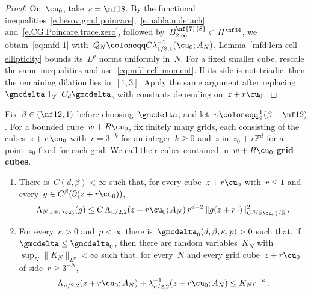 \documentclass[11pt]{amsart}
\begin{document}
\begin{proof}
On~$\cu_0$, take~$s=\nf18$. By the functional inequalities~\eqref{e.besov.grad.poincare},~\eqref{e.nabla.u.detach} and~\eqref{e.CG.Poincare.trace.zero}, followed by~$B^{\nf{7}{8}}_{2,\infty}\subset H^{\nf34}$, we obtain~\eqref{eq:mfd-1} with~$Q_N\coloneqq C\lambda_{1/8,1}^{-1}(\cu_0;A_N)$. Lemma~\ref{mfd:lem-cell-ellipticity} bounds its~$L^p$ norms uniformly in~$N$. For a fixed smaller cube, rescale the same inequalities and use~\eqref{eq:mfd-cell-moment}. If its side is not triadic, then the remaining dilation lies in~$[1,3]$. Apply the same argument after replacing~$\gmcdelta$ by~$C_d\gmcdelta$, with constants depending on~$z+r\cu_0$.
\end{proof}

Fix~$\beta\in(\nf12,1)$ before choosing~$\gmcdelta$, and let~$\upsilon\coloneqq\frac12(\beta-\nf12)$. For a bounded cube~$w+R\cu_0$, fix finitely many grids, each consisting of the cubes~$z+r\,\cu_0$ with~$r=3^{-k}$ for an integer~$k\geq0$ and~$z$ in~$z_0+r\mathbb Z^d$ for a point~$z_0$ fixed for each grid. We call their cubes contained in~$w+R\cu_0$ \textbf{grid cubes}.

\begin{lemma}
\label{mfd:lem-extension}
\begin{enumerate}[label=(\roman*)]
\item There is~$C(d,\beta)<\infty$ such that, for every cube~$z+r\cu_0$ with~$r\leq1$ and every~$g\in C^\beta(\partial(z+r\cu_0))$,
\begin{equation}
	\Lambda_{N,z+r\cu_0}(g)\leq C\,\Lambda_{\upsilon/2,2}(z+r\cu_0;A_N)\,r^{d-2}\,\|g(z+r\,\cdot)\|_{C^\beta(\partial \cu_0)/\mathbb R}^2\,.
	\label{eq:mfd-2}
\end{equation}
\item For every~$\kappa>0$ and~$p<\infty$ there is~$\gmcdelta_0(d,\beta,\kappa,p)>0$ such that, if~$\gmcdelta\leq\gmcdelta_0$, then there are random variables~$K_N$ with~$\sup_N\|K_N\|_{L^p}<\infty$ such that, for every~$N$ and every grid cube~$z+r\cu_0$ of side~$r\geq3^{-N}$,
\begin{equation}
	\Lambda_{\upsilon/2,2}(z+r\cu_0;A_N)+\lambda_{\upsilon/2,2}^{-1}(z+r\cu_0;A_N)\leq K_Nr^{-\kappa}\,.
	\label{eq:mfd-3}
\end{equation}
\end{enumerate}
\end{lemma}
\end{document}

